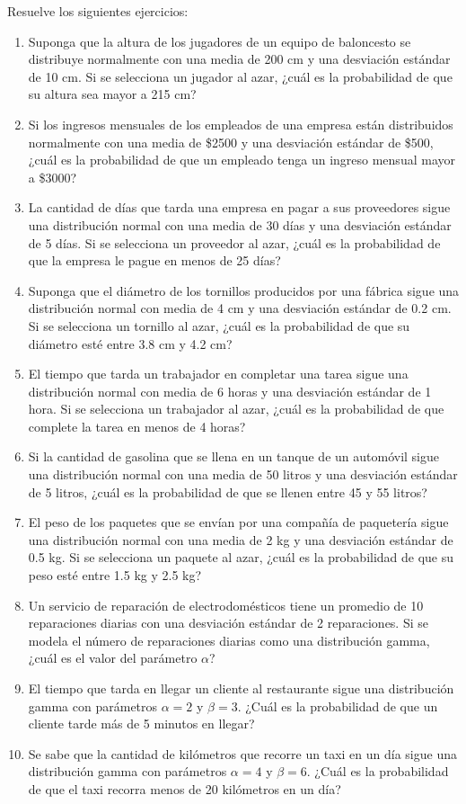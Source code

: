 \begin{Ejer}
Resuelve los siguientes ejercicios:
\begin{enumerate}

    \item Suponga que la altura de los jugadores de un equipo de baloncesto se distribuye normalmente con una media de 200 cm y una desviación estándar de 10 cm. Si se selecciona un jugador al azar, ¿cuál es la probabilidad de que su altura sea mayor a 215 cm?
    \item Si los ingresos mensuales de los empleados de una empresa están distribuidos normalmente con una media de \$2500 y una desviación estándar de \$500, ¿cuál es la probabilidad de que un empleado tenga un ingreso mensual mayor a \$3000?
    \item La cantidad de días que tarda una empresa en pagar a sus proveedores sigue una distribución normal con una media de 30 días y una desviación estándar de 5 días. Si se selecciona un proveedor al azar, ¿cuál es la probabilidad de que la empresa le pague en menos de 25 días?
    \item Suponga que el diámetro de los tornillos producidos por una fábrica sigue una distribución normal con media de 4 cm y una desviación estándar de 0.2 cm. Si se selecciona un tornillo al azar, ¿cuál es la probabilidad de que su diámetro esté entre 3.8 cm y 4.2 cm?
    \item El tiempo que tarda un trabajador en completar una tarea sigue una distribución normal con media de 6 horas y una desviación estándar de 1 hora. Si se selecciona un trabajador al azar, ¿cuál es la probabilidad de que complete la tarea en menos de 4 horas?
    \item Si la cantidad de gasolina que se llena en un tanque de un automóvil sigue una distribución normal con una media de 50 litros y una desviación estándar de 5 litros, ¿cuál es la probabilidad de que se llenen entre 45 y 55 litros?
    \item El peso de los paquetes que se envían por una compañía de paquetería sigue una distribución normal con una media de 2 kg y una desviación estándar de 0.5 kg. Si se selecciona un paquete al azar, ¿cuál es la probabilidad de que su peso esté entre 1.5 kg y 2.5 kg?  
    
        \item Un servicio de reparación de electrodomésticos tiene un promedio de 10 reparaciones diarias con una desviación estándar de 2 reparaciones. Si se modela el número de reparaciones diarias como una distribución gamma, ¿cuál es el valor del parámetro $\alpha$?
    \item El tiempo que tarda en llegar un cliente al restaurante sigue una distribución gamma con parámetros $\alpha=2$ y $\beta=3$. ¿Cuál es la probabilidad de que un cliente tarde más de 5 minutos en llegar?
    \item Se sabe que la cantidad de kilómetros que recorre un taxi en un día sigue una distribución gamma con parámetros $\alpha=4$ y $\beta=6$. ¿Cuál es la probabilidad de que el taxi recorra menos de 20 kilómetros en un día?


\end{enumerate}
\end{Ejer}
